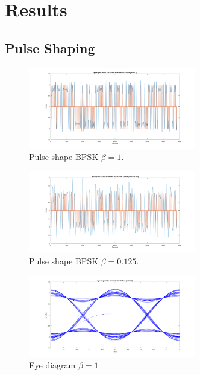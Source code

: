 \documentclass{article}
\begin{document}
\section{Results}

\subsection{Pulse Shaping}

\begin{figure}[h]
  \begin{center}
    \includegraphics[width=0.65\textwidth]{img/upsampled_bpsk_raised_cosine_beta_1.png}
    \caption{Pulse shape BPSK $\beta = 1$.}
  \end{center}
\end{figure}

\begin{figure}[h]
  \begin{center}
    \includegraphics[width=0.65\textwidth]{img/upsampled_bpsk_raised_cosine_beta_125.png}
    \caption{Pulse shape BPSK $\beta = 0.125$.}
  \end{center}
\end{figure}

\begin{figure}[h]
  \begin{center}
    \includegraphics[width=0.65\textwidth]{img/eye_diagram_beta_1.png}
    \caption{Eye diagram $\beta = 1$}
  \end{center}
\end{figure}
\end{document}
